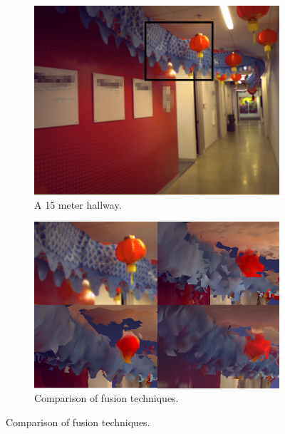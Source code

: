 \documentclass[conference]{IEEEtran}
\begin{document}
 \begin{figure} [htb]\centering
	 	 \begin{subfigure}[b] {0.25\linewidth} \centering
		 \includegraphics[width=1.0\textwidth]{img/dragon_color.png}  
		 \caption{A 15 meter hallway.}
		 \label{fig:dragon_color}
	 \end{subfigure}
	 	 \begin{subfigure}[b]{0.285\linewidth} \centering  
		 \includegraphics[width=1.0\textwidth]{img/dragon_closeup.png} 
		 \caption{Comparison of fusion techniques.}
		 \label{fig:dragon_closeup}
	 \end{subfigure} 
 	  \begin{subtable}[b]{0.4\linewidth} \centering
	\newcommand{\no}{{\ensuremath{\times}}}
	\newcommand{\yes}{{\ensuremath{\checkmark}}}

\end{subtable}
\end{figure}
\end{document}
